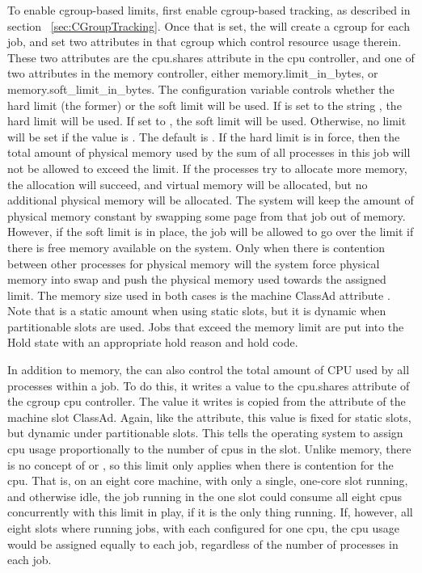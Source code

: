 To enable cgroup-based limits, first enable cgroup-based tracking, as
described in section ~\ref{sec:CGroupTracking}.  
Once that is set,
the  will create a cgroup for each job, and set two
attributes in that cgroup which control resource usage therein.  
These
two attributes are the cpu.shares attribute in the cpu controller, and one
of two attributes in the memory controller, either memory.limit\_in\_bytes, or 
memory.soft\_limit\_in\_bytes.  
The configuration variable  controls
whether the hard limit (the former) or the soft limit will be used.  
If  is set to the string , 
the hard limit will be used.
If set to , the soft limit will be used.  
Otherwise, no limit will be set if the value is .
The default is .
If the hard limit is in force, then the total amount of physical memory
used by the sum of all processes in this job will not be allowed to exceed
the limit.  
If the processes try to allocate more memory, the allocation will
succeed, and virtual memory will be allocated, 
but no additional physical memory will be allocated.
The system will keep the amount of physical memory constant by swapping some
page from that job out of memory.  
However, if the soft limit is in place,
the job will be allowed to go over the limit if there is free memory 
available on the system.  
Only when there is contention between other processes for physical memory
will the system force physical memory into swap and push
the physical memory used towards the assigned limit.
The memory size used in both cases is the machine ClassAd attribute
.
Note that  is 
a static amount when using static slots, but it is dynamic when partitionable 
slots are used.
Jobs that exceed the memory limit are put into the Hold state with an
appropriate hold reason and hold code.

In addition to memory, the  can also control 
the total amount of CPU used by all processes within a job.
To do this, it writes a value
to the cpu.shares attribute of the cgroup cpu controller.  
The value it writes is copied from the  attribute 
of the machine slot ClassAd.
Again, like the  attribute, this value is fixed for static slots,
but dynamic under partitionable slots.  
This tells the operating system
to assign cpu usage proportionally to the number of cpus in the slot.  
Unlike memory, 
there is no concept of  or , 
so this limit only applies when there is contention for the cpu.
That is, on an eight core machine, with
only a single, one-core slot running, and otherwise idle, the job running
in the one slot could consume all eight cpus concurrently with this limit
in play, if it is the only thing running.  
If, however, all eight slots where running jobs, 
with each configured for one cpu, the cpu usage would be assigned
equally to each job, regardless of the number of processes in each job.

